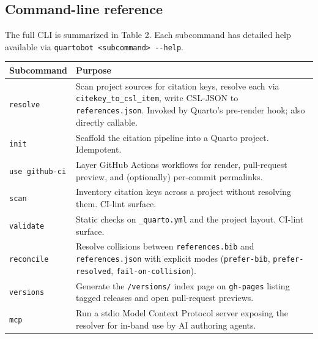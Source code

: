 \documentclass[
  letterpaper,
  DIV=11,
  numbers=noendperiod]{scrartcl}
\newcounter{none} %
\begin{document}
\subsection{Command-line reference}\label{command-line-reference}

The full CLI is summarized in Table 2. Each subcommand has detailed help
available via
\texttt{quartobot\ \textless{}subcommand\textgreater{}\ -\/-help}.

{\def\LTcaptype{none} %
\begin{longtable}[]{@{}
  >{\raggedright\arraybackslash}p{}
  >{\raggedright\arraybackslash}p{}@{}}
\toprule\noalign{}
\begin{minipage}[b]{\linewidth}\raggedright
Subcommand
\end{minipage} & \begin{minipage}[b]{\linewidth}\raggedright
Purpose
\end{minipage} \\
\midrule\noalign{}
\endhead
\bottomrule\noalign{}
\endlastfoot
\texttt{resolve} & Scan project sources for citation keys, resolve each
via \texttt{citekey\_to\_csl\_item}, write CSL-JSON to
\texttt{references.json}. Invoked by Quarto's pre-render hook; also
directly callable. \\
\texttt{init} & Scaffold the citation pipeline into a Quarto project.
Idempotent. \\
\texttt{use\ github-ci} & Layer GitHub Actions workflows for render,
pull-request preview, and (optionally) per-commit permalinks. \\
\texttt{scan} & Inventory citation keys across a project without
resolving them. CI-lint surface. \\
\texttt{validate} & Static checks on \texttt{\_quarto.yml} and the
project layout. CI-lint surface. \\
\texttt{reconcile} & Resolve collisions between \texttt{references.bib}
and \texttt{references.json} with explicit modes (\texttt{prefer-bib},
\texttt{prefer-resolved}, \texttt{fail-on-collision}). \\
\texttt{versions} & Generate the \texttt{/versions/} index page on
\texttt{gh-pages} listing tagged releases and open pull-request
previews. \\
\texttt{mcp} & Run a stdio Model Context Protocol server exposing the
resolver for in-band use by AI authoring agents. \\
\end{longtable}
}
\end{document}
